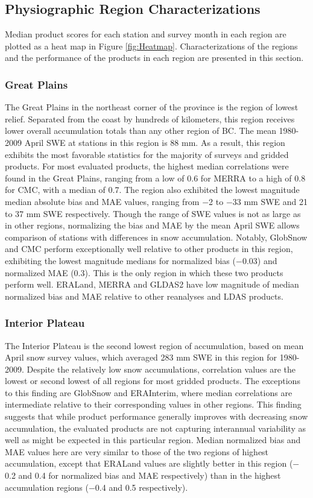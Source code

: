 \documentclass[12pt]{article}
\begin{document}
\subsection{Physiographic Region Characterizations}  
Median product scores for each station and survey month in each region are plotted as a heat map in Figure \ref{fig:Heatmap}.  
Characterizations of the regions and the performance of the products in each region are presented in this section.

\subsubsection{Great Plains}
The Great Plains in the northeast corner of the province is the region of lowest relief.  Separated from the coast by hundreds of kilometers, this region receives lower overall accumulation totals than any other region of BC.  The mean 1980-2009 April SWE at stations in this region is 88 mm.  As a result, this region exhibits the most favorable statistics for the majority of surveys and gridded products.  For most evaluated products, the highest median correlations were found in the Great Plains, ranging from a low of 0.6 for MERRA to a high of 0.8 for CMC, with a median of 0.7.  The region also exhibited the lowest magnitude median absolute bias and MAE values, ranging from $-$2 to $-$33 mm SWE and 21 to 37 mm SWE respectively.  Though the range of SWE values is not as large as in other regions, normalizing the bias and MAE by the mean April SWE allows comparison of stations with differences in snow accumulation.  Notably, GlobSnow and CMC perform exceptionally well relative to other products in this region, exhibiting the lowest magnitude medians for normalized bias ($-$0.03) and normalized MAE (0.3).  This is the only region in which these two products perform well.  ERALand, MERRA and GLDAS2 have low magnitude of median normalized bias and MAE relative to other reanalyses and LDAS products.

\subsubsection{Interior Plateau} 
The Interior Plateau is the second lowest region of accumulation, based on mean April snow survey values, which averaged 283 mm SWE in this region for 1980-2009.  Despite the relatively low snow accumulations, correlation values are the lowest or second lowest of all regions for most gridded products.  The exceptions to this finding are GlobSnow and ERAInterim, where median correlations are intermediate relative to their corresponding values in other regions.  This finding suggests that while product performance generally improves with decreasing snow accumulation, the evaluated products are not capturing interannual variability as well as might be expected in this particular region.  Median normalized bias and MAE values here are very similar to those of the two regions of highest accumulation, except that ERALand values are slightly better in this region ($-$0.2 and 0.4 for normalized bias and MAE respectively) than in the highest accumulation regions ($-$0.4 and 0.5 respectively).
\end{document}
